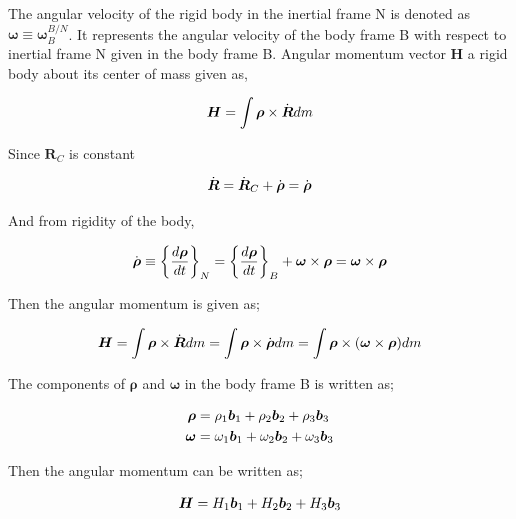 The angular velocity of the rigid body in the inertial frame N is denoted as $\bm{\omega} \equiv \bm{\omega}_B^{B/N}$. 
It represents the angular velocity of the body frame B with respect to inertial frame N given in the body frame B. 
Angular momentum vector $\bm{H}$ a rigid body about its center of mass given as,

\begin{equation}{\label{eqn:kinematicEquDQM}}
\bm{H} = \int \bm{\rho} \times \dot{\bm{R}} dm
\end{equation}

Since $\bm{R}_C$ is constant

\begin{equation}{\label{eqn:kinematicEquDQM}}
\dot{\bm{R}} = \dot{\bm{R}}_C + \dot{\bm{\rho}} = \dot{\bm{\rho}}
\end{equation}

And from rigidity of the body,

\begin{equation}{\label{eqn:kinematicEquDQM}}
\dot{\bm{\rho}} \equiv \bigg\{ \frac{d\bm{\rho}}{dt} \bigg\}_N = \bigg\{ \frac{d\bm{\rho}}{dt} \bigg\}_B + \bm{\omega} \times \bm{\rho} = \bm{\omega} \times \bm{\rho}
\end{equation}

Then the angular momentum is given as;

\begin{equation}{\label{eqn:kinematicEquDQM}}
\bm{H} = \int \bm{\rho} \times \dot{\bm{R}} dm = \int \bm{\rho} \times \dot{\bm{\rho}} dm = \int \bm{\rho} \times  (\bm{\omega} \times \bm{\rho} )dm
\end{equation}

The components of $\bm{\rho}$ and $\bm{\omega}$ in the body frame B is written as;

\begin{align}{\label{eqn:omega_and_rho}}
\begin{split}
\bm{\rho} & = \rho_1 \bm{b}_1 + \rho_2 \bm{b}_2 + \rho_3 \bm{b}_3 \\
\bm{\omega} & = \omega_1 \bm{b}_1 + \omega_2 \bm{b}_2 + \omega_3 \bm{b}_3 \\
\end{split}
\end{align}

Then the angular momentum can be written as;

\begin{equation}{\label{eqn:angMomentumComp}}
\bm{H} = H_1 \bm{b}_1 + H_2 \bm{b}_2 + H_3 \bm{b}_3 
\end{equation}

